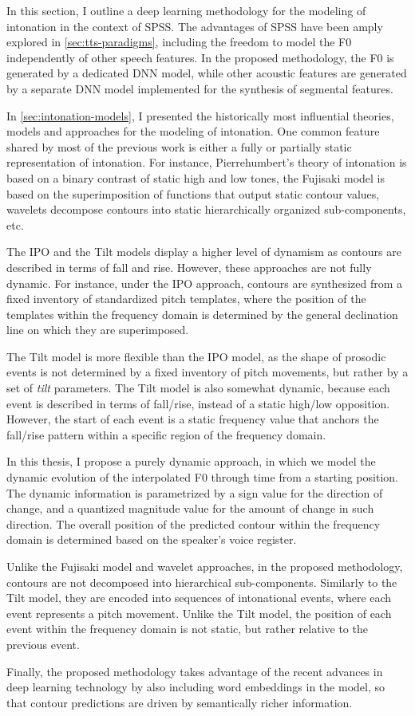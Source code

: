 In this section, I outline a deep learning methodology for the modeling of intonation in the context of \ac{SPSS}.
The advantages of \ac{SPSS} have been amply explored in \autoref{sec:tts-paradigms}, including the freedom to model the \ac{F0} independently of other speech features.
In the proposed methodology, the \ac{F0} is generated by a dedicated \ac{DNN} model, while other acoustic features are generated by a separate \ac{DNN} model implemented for the synthesis of segmental features.

In \autoref{sec:intonation-models}, I presented the historically most influential theories, models and approaches for the modeling of intonation.
One common feature shared by most of the previous work is either a fully or partially static representation of intonation.
For instance, Pierrehumbert's theory of intonation is based on a binary contrast of static high and low tones, the Fujisaki model is based on the superimposition of functions that output static contour values, wavelets decompose contours into static hierarchically organized sub-components, etc.

The IPO and the Tilt models display a higher level of dynamism as contours are described in terms of fall and rise.
However, these approaches are not fully dynamic.
For instance, under the IPO approach, contours are synthesized from a fixed inventory of standardized pitch templates, where the position of the templates within the frequency domain is determined by the general declination line on which they are superimposed.

The Tilt model is more flexible than the IPO model, as the shape of prosodic events is not determined by a fixed inventory of pitch movements, but rather by a set of \emph{tilt} parameters.
The Tilt model is also somewhat dynamic, because each event is described in terms of fall/rise, instead of a static high/low opposition.
However, the start of each event is a static frequency value that anchors the fall/rise pattern within a specific region of the frequency domain.

In this thesis, I propose a purely dynamic approach, in which we model the dynamic evolution of the interpolated \ac{F0} through time from a starting position.
The dynamic information is parametrized by a sign value for the direction of change, and a quantized magnitude value for the amount of change in such direction.
The overall position of the predicted contour within the frequency domain is determined based on the speaker's voice register.

Unlike the Fujisaki model and wavelet approaches, in the proposed methodology, contours are not decomposed into hierarchical sub-components.
Similarly to the Tilt model, they are encoded into sequences of intonational events, where each event represents a pitch movement.
Unlike the Tilt model, the position of each event within the frequency domain is not static, but rather relative to the previous event.

Finally, the proposed methodology takes advantage of the recent advances in deep learning technology by also including word embeddings in the model, so that contour predictions are driven by semantically richer information.
